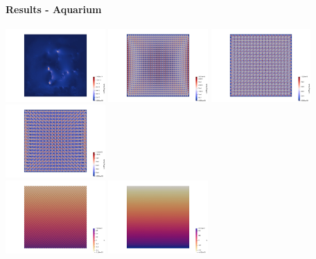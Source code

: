 \newpage
\paragraph{Results - Aquarium}

\begin{center}
\includegraphics[width=3.8cm]{python_codes/fieldstone_78/results/aquarium/vel0}
\includegraphics[width=3.8cm]{python_codes/fieldstone_78/results/aquarium/vel1}
\includegraphics[width=3.8cm]{python_codes/fieldstone_78/results/aquarium/vel2}
\includegraphics[width=3.8cm]{python_codes/fieldstone_78/results/aquarium/vel3}\\
\includegraphics[width=3.8cm]{python_codes/fieldstone_78/results/aquarium/p0}
\includegraphics[width=3.8cm]{python_codes/fieldstone_78/results/aquarium/p1}

\end{center}
